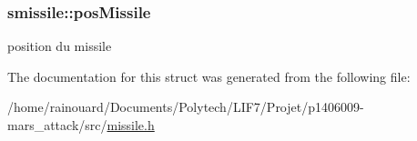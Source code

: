 \subsubsection[{\texorpdfstring{pos\+Missile}{posMissile}}]{ smissile\+::pos\+Missile}\hypertarget{structsmissile_a005c70a80285c73e9fac6cf42032e4c7}{}\label{structsmissile_a005c70a80285c73e9fac6cf42032e4c7}
position du missile 

The documentation for this struct was generated from the following file\+:\begin{DoxyCompactItemize}
\item 
/home/rainouard/\+Documents/\+Polytech/\+L\+I\+F7/\+Projet/p1406009-\/mars\+\_\+attack/src/\hyperlink{missile_8h}{missile.\+h}\end{DoxyCompactItemize}
